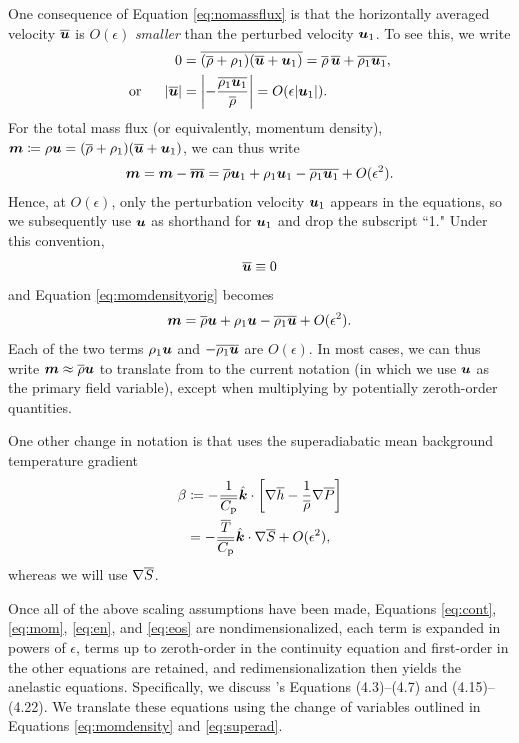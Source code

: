 \documentclass[12pt]{article}
\newcommand{\veck}{\hat{\bm{k}}}
\newcommand{\uover}{\overline{\vecu}}
\begin{document}
	One consequence of Equation \eqref{eq:nomassflux} is that the horizontally averaged velocity $\overline{\bm{u}}$ is $O(\epsilon)$ \textit{smaller} than the perturbed velocity $\bm{u}_1$. To see this, we write
	\begin{align}
		0 &= \overline{(\rhoover+\rhoone)(\overline{\vecu}+\vecu_1)} = \rhoover\,\uover + \overline{\rhoone\vecu_1},\nonumber\\
		\orr |\uover| &= \left|-\frac{\overline{\rhoone\vecu_1}}{\rhoover}\right| = O(\epsilon|\vecu_1|).
	\end{align}
	For the total mass flux (or equivalently, momentum density), $\bm{m}\coloneqq \rho\bm{u}=(\overline{\rho}+\rho_1)(\overline{\bm{u}}+\bm{u}_1)$, we can thus write
		\begin{align}\label{eq:momdensityorig}
		\bm{m} = \bm{m}-\overline{\bm{m}}=\overline{\rho}\bm{u}_1 + \rho_1\bm{u}_1 - \overline{\rho_1\bm{u}_1} + O(\epsilon^2).
	\end{align}
	Hence, at $O(\epsilon)$, only the perturbation velocity $\bm{u}_1$ appears in the equations, so we subsequently use $\bm{u}$ as shorthand for $\bm{u}_1$ and drop the subscript ``1." Under this convention,
\begin{align}\label{eq:nomeanu}
	\overline{\bm{u}}\equiv0
\end{align}
	and Equation \eqref{eq:momdensityorig} becomes
	\begin{align}\label{eq:momdensity}
		\bm{m} = \overline{\rho}\bm{u} + \rho_1\bm{u} - \overline{\rho_1\bm{u}} + O(\epsilon^2).
	\end{align}
	Each of the two terms $\rho_1\bm{u}$ and $-\overline{\rho_1\bm{u}}$ are $O(\epsilon)$. In most cases, we can thus write $\bm{m} \approx \overline{\rho} \bm{u}$ to translate from \citet{Gough1969} to the current notation (in which we use $\bm{u}$ as the primary field variable), except when multiplying by potentially zeroth-order quantities.
	
	 One other change in notation is that \citet{Gough1969} uses the superadiabatic mean background temperature gradient
	\begin{align}\label{eq:superad}
		\beta &\define -\frac{1}{\cpover}\veck\cdot\left[\nabla\overline{h}-\frac{1}{\rhoover}\nabla\prsover\right]\nonumber\\
		&=-\frac{\tmpover}{\cpover}\veck\dotgrad\entrover + O(\epsilon^2),
	\end{align}
	whereas we will use $\nabla \overline{S}$. 
	
	Once all of the above scaling assumptions have been made, Equations \eqref{eq:cont}, \eqref{eq:mom}, \eqref{eq:en}, and \eqref{eq:eos} are nondimensionalized, each term is expanded in powers of $\epsilon$, terms up to zeroth-order in the continuity equation and first-order in the other equations are retained, and redimensionalization then yields the anelastic equations. Specifically, we discuss \citet{Gough1969}'s Equations (4.3)--(4.7) and (4.15)--(4.22). We translate these equations using the change of variables outlined in Equations \eqref{eq:momdensity} and \eqref{eq:superad}. 
	
\end{document}
